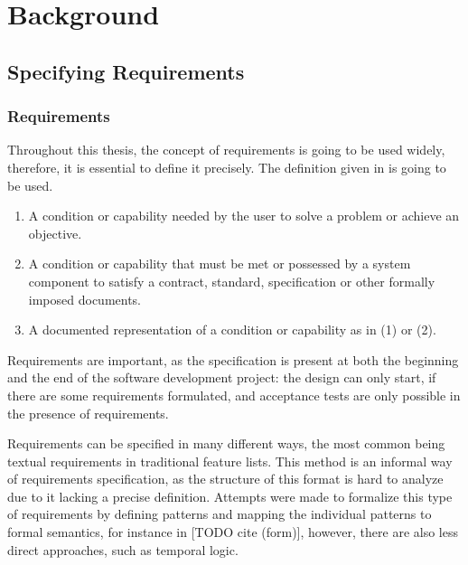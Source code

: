 \chapter{Background}

\section{Specifying Requirements} \label{sec_backgrspecreq}

\subsection{Requirements} \label{subs_backgrreq}

Throughout this thesis, the concept of requirements is going to be used widely, therefore, it is essential to define it precisely. The definition given in \cite{sweterminology} is going to be used.

\begin{definition}[Requirement]
	\mbox{}
	\begin{enumerate}
		\setlength\itemsep{0.1em}
		\item A condition or capability needed by the user to solve a problem or achieve an objective.
		\item A condition or capability that must be met or possessed by a system component to satisfy a contract, standard, specification or other formally imposed documents.
		\item A documented representation of a condition or capability as in (1) or (2).
	\end{enumerate}
\end{definition}

Requirements are important, as the specification is present at both the beginning and the end of the software development project: the design can only start, if there are some requirements formulated, and acceptance tests are only possible in the presence of requirements.

Requirements can be specified in many different ways, the most common being textual requirements in traditional feature lists. This method is an informal way of requirements specification, as the structure of this format is hard to analyze due to it lacking a precise definition. Attempts were made to formalize this type of requirements by defining patterns and mapping the individual patterns to formal semantics, for instance in [TODO cite (form)], however, there are also less direct approaches, such as temporal logic. 

